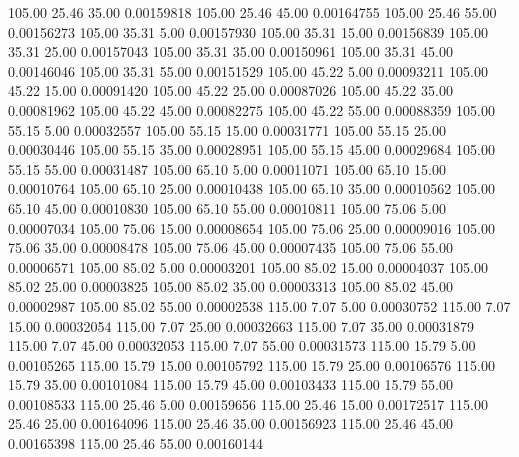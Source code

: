     105.00     25.46     35.00     0.00159818
    105.00     25.46     45.00     0.00164755
    105.00     25.46     55.00     0.00156273
    105.00     35.31      5.00     0.00157930
    105.00     35.31     15.00     0.00156839
    105.00     35.31     25.00     0.00157043
    105.00     35.31     35.00     0.00150961
    105.00     35.31     45.00     0.00146046
    105.00     35.31     55.00     0.00151529
    105.00     45.22      5.00     0.00093211
    105.00     45.22     15.00     0.00091420
    105.00     45.22     25.00     0.00087026
    105.00     45.22     35.00     0.00081962
    105.00     45.22     45.00     0.00082275
    105.00     45.22     55.00     0.00088359
    105.00     55.15      5.00     0.00032557
    105.00     55.15     15.00     0.00031771
    105.00     55.15     25.00     0.00030446
    105.00     55.15     35.00     0.00028951
    105.00     55.15     45.00     0.00029684
    105.00     55.15     55.00     0.00031487
    105.00     65.10      5.00     0.00011071
    105.00     65.10     15.00     0.00010764
    105.00     65.10     25.00     0.00010438
    105.00     65.10     35.00     0.00010562
    105.00     65.10     45.00     0.00010830
    105.00     65.10     55.00     0.00010811
    105.00     75.06      5.00     0.00007034
    105.00     75.06     15.00     0.00008654
    105.00     75.06     25.00     0.00009016
    105.00     75.06     35.00     0.00008478
    105.00     75.06     45.00     0.00007435
    105.00     75.06     55.00     0.00006571
    105.00     85.02      5.00     0.00003201
    105.00     85.02     15.00     0.00004037
    105.00     85.02     25.00     0.00003825
    105.00     85.02     35.00     0.00003313
    105.00     85.02     45.00     0.00002987
    105.00     85.02     55.00     0.00002538
    115.00      7.07      5.00     0.00030752
    115.00      7.07     15.00     0.00032054
    115.00      7.07     25.00     0.00032663
    115.00      7.07     35.00     0.00031879
    115.00      7.07     45.00     0.00032053
    115.00      7.07     55.00     0.00031573
    115.00     15.79      5.00     0.00105265
    115.00     15.79     15.00     0.00105792
    115.00     15.79     25.00     0.00106576
    115.00     15.79     35.00     0.00101084
    115.00     15.79     45.00     0.00103433
    115.00     15.79     55.00     0.00108533
    115.00     25.46      5.00     0.00159656
    115.00     25.46     15.00     0.00172517
    115.00     25.46     25.00     0.00164096
    115.00     25.46     35.00     0.00156923
    115.00     25.46     45.00     0.00165398
    115.00     25.46     55.00     0.00160144
